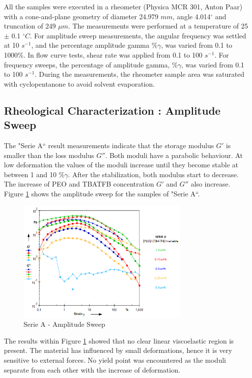 All the samples were executed in a rheometer (Physica MCR 301, Anton Paar) with a cone-and-plane geometry of diameter 24.979 $m m$, angle 4.014$^\circ$ and truncation of 249 $\mu m$. The measurements were performed at a temperature of 25 $\pm$ 0.1 $^\circ C$. For amplitude sweep measurements, the angular frequency was settled at 10 $s^{-1}$, and the percentage amplitude gamma $\% \gamma$, was varied from 0.1 to 1000\%. In flow curve tests, shear rate was applied from 0.1 to 100 $s^{-1}$. For frequency sweeps, the percentage of amplitude gamma, $\% \gamma$, was varied from 0.1 to 100 $s^{-1}$. During the measurements, the rheometer sample area was saturated with cyclopentanone to avoid solvent evaporation.

\subsection{Rheological Characterization : \textbf{Amplitude Sweep}}
The "Serie A`` result measurements indicate that the storage modulus $G'$ is smaller than the loss modulus $G''$. Both moduli have a parabolic behaviour. At low deformation the values of the moduli increase until they become stable at between 1 and 10 $\% \gamma$. After the stabilization, both modulus start to decrease. The increase of PEO and TBATFB concentration $G'$ and $G''$ also increase. Figure \ref{fig:SerieAampSweep} shows the amplitude sweep for the samples of "Serie A``.

\begin{figure}[th]
\centering
\includegraphics[width=0.75\textwidth]{./Figures/SerieAampSweep.png}
\decoRule
\caption[Serie A - Amplitude Sweep]{Serie A - Amplitude Sweep}
\label{fig:SerieAampSweep}
\end{figure}

The results within Figure \ref{fig:SerieAampSweep} showed that no clear linear viscoelastic region is present. The material has influenced by small deformations, hence it is very sensitive to external forces. No yield point was encountered as the moduli separate from each other with the increase of deformation.


